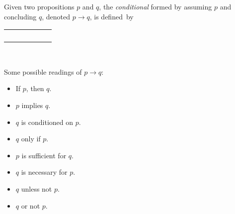 \begin{definition}
    \begin{center}
        \begin{minipage}[t]{.55\linewidth}
            Given two propositions $p$ and $q$, the \emph{conditional} formed by assuming $p$ and concluding $q$,
            denoted $p \rightarrow q$, is defined~by
            \begin{table}[H]
                \centering
                \label{tab:implies}
                \begin{tabular}{|CcCc||Cc|}
                    \hline
                     &  &  \\ \hline
                    \thead{$\top$} & \thead{$\top$} &  \\
                    \thead{$\top$} & \thead{$\bot$} &  \\
                    \thead{$\bot$} & \thead{$\top$} &  \\
                    \thead{$\bot$} & \thead{$\bot$} &  \\ \hline
                \end{tabular}
            \end{table}
        \end{minipage}%
        \begin{minipage}[t]{.05\linewidth}
            ~
        \end{minipage}%
        \begin{minipage}[t]{.4\linewidth}
            Some possible readings of $p \rightarrow q$:\\
            \begin{itemize}
                \item[\cdot]
                    If $p$, then $q$.
                \item[\cdot]
                    $p$ implies $q$.
                \item[\cdot]
                    $q$ is conditioned on $p$.
                \item[\cdot]
                    $q$ only if $p$.
                \item[\cdot]
                    $p$ is sufficient for $q$.
                \item[\cdot]
                    $q$ is necessary for $p$.
                \item[\cdot]
                    $q$ unless not $p$.
                \item[\cdot]
                    $q$ or not $p$.
            \end{itemize}
        \end{minipage}
    \end{center}
\end{definition}

